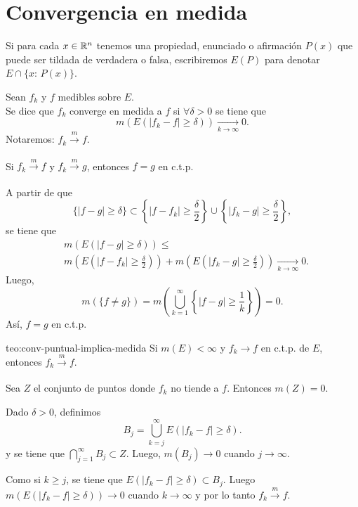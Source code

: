 \section{Convergencia en medida}

Si para cada $x\in \mathbb{R}^n$ tenemos una propiedad, enunciado o afirmaci\'on $P(x)$ que puede ser tildada de  verdadera o falsa, escribiremos $E(P)$ para denotar $E\cap \{x:\,P(x)\}$.

\begin{definicion}{}
Sean $f_k$ y $f$  medibles sobre $E$.\\
Se dice que $f_k$ converge en medida a $f$ si $\forall \delta>0$ se tiene que 
\[
m(E(|f_k-f|\geq \delta))\xrightarrow[k \to \infty]{} 0.
\]
Notaremos: $f_k \xrightarrow[]{m} f$.
\end{definicion}

\begin{teorema}{}
Si $f_k \xrightarrow[]{m}f$ y $f_k \xrightarrow[]{m} g$, entonces
$f=g$ en c.t.p.
\end{teorema}

\begin{demo}
A partir de que 
\[
\{|f-g|\geq \delta\} \subset 
\left\{|f-f_k|\geq\frac{\delta}{2}\right\} \cup \left\{|f_k-g|\geq\frac{\delta}{2}\right\}, 
\]
se tiene que 
\[
\begin{split}
&m\left(E\left(|f-g|\geq \delta\right)\right)\leq 
\\
&m\left(E\left(|f-f_k|\geq \frac{\delta}{2}\right)\right)+
m\left(E\left(|f_k-g|\geq \frac{\delta}{2}\right)\right) \xrightarrow[k \to \infty]{} 0.
\end{split}
\]
Luego, 
\[
m(\{f\neq g\})=
m\left( \bigcup\limits_{k=1}^{\infty} \left\{|f-g|\geq \frac{1}{k}  \right\} \right)=0.
\]
As\'i, $f=g$ en c.t.p.
\end{demo}


\begin{teorema}{teo:conv-puntual-implica-medida}
Si $m(E)<\infty$ y $f_k \to f$ en c.t.p. de $E$, entonces 
$f_k \xrightarrow[]{m}f$.
\end{teorema}


\begin{demo}
Sea $Z$ el conjunto de puntos donde $f_k$ no tiende a $f$. Entonces $m(Z)=0$. 

Dado $\delta>0$, definimos 
\[
B_j=\bigcup\limits_{k=j}^{\infty} E(|f_k-f|\geq \delta).
\]
 y se tiene que $ \bigcap\limits_{j=1}^{\infty} B_j\subset Z.$
 Luego, $m(B_j)\to 0$ cuando $j \to \infty$.
 
 Como si $k \geq j$, se tiene que $E(|f_k-f|\geq \delta )\subset B_j$.
Luego $m(E(|f_k-f|\geq \delta))\to 0$ cuando $k \to \infty$
y por lo tanto $f_k \xrightarrow[]{m}f.$
\end{demo}

